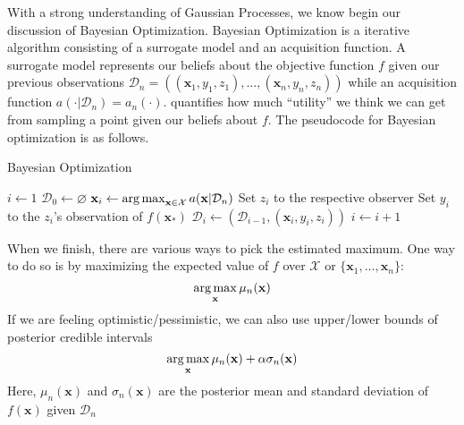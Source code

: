 With a strong understanding of Gaussian Processes, we know begin our discussion of Bayesian Optimization.
Bayesian Optimization is a iterative algorithm consisting of a surrogate model and an acquisition function.
A surrogate model represents our beliefs about the objective function $f$ given our previous observations $\mathcal{D}_n = ((\mathbf{x}_1, y_1, z_1), \ldots, (\mathbf{x}_n, y_n, z_n))$ while an acquisition function $a( \cdot | \mathcal{D}_n) = a_n(\cdot)$.
quantifies how much ``utility'' we think we can get from sampling a point given our beliefs about $f$.
The pseudocode for Bayesian optimization is as follows.

\begin{algorithm}
    \begin{algorithmic}
        \caption{Bayesian Optimization}\label{alg:bo}
        \State $i \gets 1$
        \State $\mathcal{D}_0 \gets \varnothing$
        \State $\mathbf{x}_i \gets \operatorname*{arg\,max}_{\mathbf{x} \in \mathcal{X}} a(\mathbf{x} | \mathcal{D}_n)$  
        \State Set $z_i$ to the respective observer
        \State Set $y_i$ to the $z_i$'s observation of $f(\mathbf{x}_*)$
        \State $\mathcal{D}_i \gets (\mathcal{D}_{i - 1}, (\mathbf{x}_i, y_i, z_i))$
        \State $i \gets i + 1$
        \EndWhile
    \end{algorithmic}
\end{algorithm}

When we finish, there are various ways to pick the estimated maximum.
One way to do so is by maximizing the expected value of $f$ over $\mathcal{X}$ or $\{ \mathbf{x}_1, \ldots, \mathbf{x}_n \}$:
\begin{equation*}
    \operatorname*{arg\,max}_{\mathbf{x}} \mu_n(\mathbf{x})
\end{equation*}
If we are feeling optimistic/pessimistic, we can also use upper/lower bounds of posterior credible intervals
\begin{equation*}
    \operatorname*{arg\,max}_{\mathbf{x}} \mu_n(\mathbf{x}) + \alpha \sigma_n(\mathbf{x})
\end{equation*}
Here, $\mu_n(\mathbf{x})$ and $\sigma_n(\mathbf{x})$ are the posterior mean and standard deviation of $f(\mathbf{x})$ given $\mathcal{D}_n$


